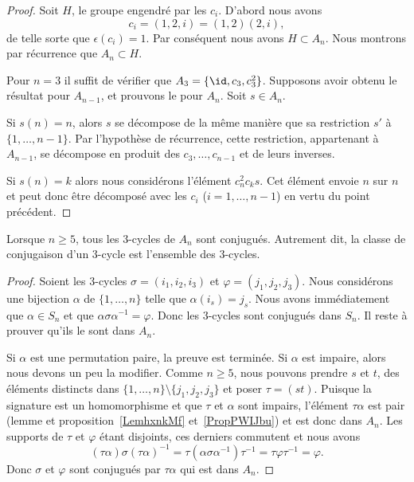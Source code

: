 \begin{proof}
    Soit \( H\), le groupe engendré par les \( c_i\). D'abord nous avons
    \begin{equation}
        c_i=(1,2,i)=(1,2)(2,i),
    \end{equation}
    de telle sorte que \( \epsilon(c_i)=1\). Par conséquent nous avons \( H\subset A_n\). Nous montrons par récurrence que \( A_n\subset H\).

    Pour \( n=3\) il suffit de vérifier que \( A_3=\{ \id,c_3,c_3^2 \}\). Supposons avoir obtenu le résultat pour \(A_{n-1}\), et prouvons le pour \( A_n\). Soit \( s\in A_n\).

    Si \( s(n)=n\), alors \( s\) se décompose de la même manière que sa restriction \( s'\) à \( \{ 1,\ldots, n-1 \}\). Par l'hypothèse de récurrence, cette restriction, appartenant à \( A_{n-1}\),  se décompose en produit des \( c_3,\ldots, c_{n-1}\) et de leurs inverses.

    Si \( s(n)=k\) alors nous considérons l'élément \( c^2_nc_ks\). Cet élément envoie \( n\) sur \( n\) et peut donc être décomposé avec les \( c_i\) (\( i=1,\ldots, n-1\)) en vertu du point précédent.
\end{proof}

\begin{proposition} \label{PropiodtBG}
    Lorsque \( n\geq 5\), tous les \( 3\)-cycles de \( A_n\) sont conjugués. Autrement dit, la classe de conjugaison d'un \( 3\)-cycle est l'ensemble des \( 3\)-cycles.
\end{proposition}

\begin{proof}
    Soient les \( 3\)-cycles \( \sigma=(i_1,i_2,i_3)\) et \( \varphi=(j_1,j_2,j_3)\). Nous considérons une bijection \( \alpha\) de \( \{ 1,\ldots, n \}\) telle que \( \alpha(i_s)=j_s\). Nous avons immédiatement que \( \alpha\in S_n\) et que \( \alpha\sigma\alpha^{-1}=\varphi\). Donc les \( 3\)-cycles sont conjugués dans \( S_n\). Il reste à prouver qu'ils le sont dans \( A_n\).

    Si \( \alpha\) est une permutation paire, la preuve est terminée. Si \( \alpha\) est impaire, alors nous devons un peu la modifier. Comme \( n\geq 5\), nous pouvons prendre \( s\) et \( t\), des éléments distincts dans \( \{ 1,\ldots, n \}\setminus\{ j_1,j_2,j_3 \}\) et poser \( \tau=(st)\). Puisque la signature est un homomorphisme et que \( \tau\) et \( \alpha\) sont impairs, l'élément \( \tau\alpha\) est pair (lemme et proposition~\ref{LemhxnkMf} et~\ref{PropPWIJbu}) et est donc dans \( A_n\). Les supports de \( \tau\) et \( \varphi\) étant disjoints, ces derniers commutent et nous avons
    \begin{equation}
        (\tau\alpha)\sigma(\tau\alpha)^{-1}=\tau(\alpha\sigma\alpha^{-1})\tau^{-1}=\tau\varphi\tau^{-1} = \varphi.
    \end{equation}
    Donc \( \sigma\) et \( \varphi\) sont conjugués par \( \tau\alpha\) qui est dans \( A_n\).
\end{proof}

